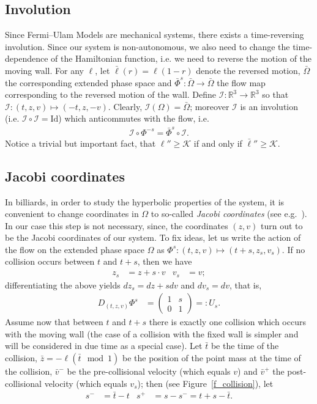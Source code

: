 \documentclass[10pt]{amsart}
\theoremstyle{definition}\newtheorem{defi}[theo]{Definition}\newtheorem{rema}[theo]{Remark}\newtheorem{exam}[theo]{Example}\newtheorem{exem}[theo]{Example}\newtheorem{nota}[theo]{Notation}
\newcommand{\ct}{r}
\newcommand{\deh}{\mathrm{d}}
\newcommand{\bR}{\mathbb{R}}
\newcommand{\cK}{\mathcal{K}}
\newcommand{\cI}{\mathcal{I}}
\newcommand{\matrixtt}[4]{\left(
\begin{array}{cc}#1&#2\\#3&#4
\end{array}\right)}
\newcommand{\exph}{\Omega}
\newcommand{\invo}{\cI}
\newcommand{\flow}[1]{\Phi^{#1}}
\newcommand{\rflow}[1]{\bar\Phi^{#1}}
\newcommand{\rell}{\bar\ell}
\newcommand{\ppPrivate}[2]{#1^{#2}}
\newcommand{\prePrivate}[1]{\ppPrivate{#1}{-}}
\newcommand{\postPrivate}[1]{\ppPrivate{#1}{+}}
\newcommand{\prv}{\prePrivate{\bar v}}
\newcommand{\pov}{\postPrivate{\bar v}}
\newcommand{\prs}{\prePrivate{s}}
\newcommand{\pos}{\postPrivate{s}}
\renewcommand{\deh}{d}
\newcommand{\Id}{\mathrm{Id}}
\begin{document}
\subsection{Involution}\label{SSInvolution}
Since Fermi--Ulam Models are mechanical systems, there exists a time-{}reversing involution. Since our system is non-autonomous, we also need to change the time-dependence of the Hamiltonian function, i.e. we need to reverse the motion of the moving wall. For any $\ell$, let $\rell(\ct)=\ell(1-\ct)$ denote the reversed motion, $\bar\exph$ the corresponding extended phase space and $\rflow{s}:\bar\exph\to\bar\exph$ the flow map corresponding to the reversed motion of the wall. Define $\invo:\bR^3\to\bR^3$ so that $\invo:(t,z,v)\mapsto(-t,z,-v)$. Clearly, $\invo(\exph)=\bar\exph$; moreover $\invo$ is an involution (i.e. $\invo\circ\invo = \Id$) which anticommutes with the flow, i.e.
\begin{align*}
\invo\circ\flow{-s} = \rflow{s}\circ\invo.
\end{align*}
Notice a trivial but important fact, that $\ell''\geq\cK$ if and only if ${\bar\ell}''\geq\cK$.

\subsection{Jacobi coordinates} 

In billiards, in order to study the hyperbolic properties of the system, it is convenient to change coordinates in $\exph$ to so-called
\emph{Jacobi coordinates} (see e.g.~\cite{Wojt}). In our case this step is not necessary, since, the coordinates $(z,v)$ turn out to be the Jacobi coordinates of our system. To fix ideas, let us write the action of the flow on the extended phase space $\exph$ as \(\flow{s}:(t,z,v)\mapsto(t+s,z_s,v_s).\) If no collision occurs between $t$ and $t+s$, then we have
\begin{align}\label{e_freeFlight}
z_s&=z+s\cdot v& v_s&=v;
\end{align}
differentiating the above yields $\deh z_s = \deh z + s\deh v$ and $\deh v_s = \deh v$, that is,
\begin{align*}
D_{(t,z,v)}\flow{s}&=\matrixtt{1}{s}{0}{1}=:U_s.
\end{align*}
Assume now that between $t$ and $t+s$ there is exactly one collision which occurs with the moving wall (the case of a collision with the fixed wall is simpler and will be considered in due time as a special case). Let $\bar t$ be the time of the collision, $\bar z=-\ell(\bar t \mod 1)$ be the position of the point mass at the time of the collision, $\prv$ be the pre-collisional velocity (which equals $v$) and $\pov$ the post-collisional velocity (which equals $v_{s}$); then (see Figure~\ref{f_collision}), let
\begin{align}\label{eq:prs=bar-t-tpos=s}
\prs&=\bar t-t&\pos&=s-\prs=t+s-\bar t.
\end{align}
\end{document}
